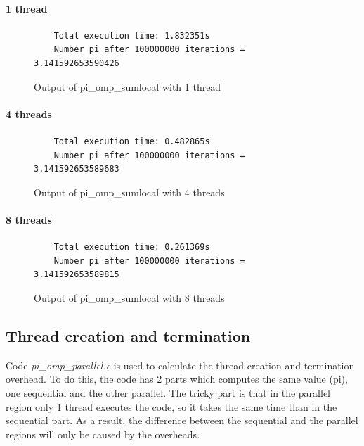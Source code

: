 \documentclass[12pt, a4paper]{article}
\begin{document}
\paragraph{1 thread}

\begin{figure}[H]
	\begin{lstlisting}
	Total execution time: 1.832351s
	Number pi after 100000000 iterations = 3.141592653590426		
	\end{lstlisting}
	\caption{Output of pi\_omp\_sumlocal with 1 thread}
\end{figure}

\paragraph{4 threads}

\begin{figure}[H]
	\begin{lstlisting}
	Total execution time: 0.482865s
	Number pi after 100000000 iterations = 3.141592653589683					
	\end{lstlisting}
	\caption{Output of pi\_omp\_sumlocal with 4 threads}
\end{figure}

\paragraph{8 threads}

\begin{figure}[H]
	\begin{lstlisting}
	Total execution time: 0.261369s
	Number pi after 100000000 iterations = 3.141592653589815		
	\end{lstlisting}
	\caption{Output of pi\_omp\_sumlocal with 8 threads}
\end{figure}

\subsection{Thread creation and termination}

Code \textit{pi\_omp\_parallel.c} is used to calculate the thread creation and termination overhead. To do this, the code has 2 parts which computes the same value (pi), one sequential and the other parallel. The tricky part is that in the parallel region only 1 thread executes the code, so it takes the same time than in the sequential part. As a result, the difference between the sequential and the parallel regions will only be caused by the overheads.
\end{document}

